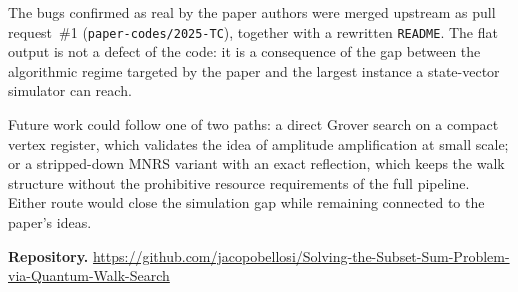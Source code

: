 \documentclass[11pt,a4paper]{article}
\begin{document}
The bugs confirmed as real by the paper authors were merged upstream as pull request~\#1 (\texttt{paper-codes/2025-TC}), together with a rewritten \texttt{README}. The flat output is not a defect of the code: it is a consequence of the gap between the algorithmic regime targeted by the paper and the largest instance a state-vector simulator can reach.

Future work could follow one of two paths: a direct Grover search on a compact vertex register, which validates the idea of amplitude amplification at small scale; or a stripped-down MNRS variant with an exact reflection, which keeps the walk structure without the prohibitive resource requirements of the full pipeline. Either route would close the simulation gap while remaining connected to the paper's ideas.

\bigskip

\noindent\textbf{Repository.}
\url{https://github.com/jacopobellosi/Solving-the-Subset-Sum-Problem-via-Quantum-Walk-Search}

\bigskip
\end{document}
